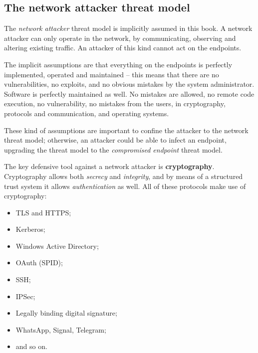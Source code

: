 \documentclass[10pt]{extbook}
\begin{document}
\subsection{The network attacker threat model}

The \emph{network attacker} threat model is implicitly assumed in this book. A
network attacker can only operate in the network, by communicating, observing
and altering existing traffic. An attacker of this kind cannot act on the
endpoints.

The implicit assumptions are that everything on the endpoints is perfectly
implemented, operated and maintained -- this means that there are no
vulnerabilities, no exploits, and no obvious mistakes by the system
administrator. Software is perfectly maintained as well. No mistakes are
allowed, no remote code execution, no vulnerability, no mistakes from the
users, in cryptography, protocols and communication, and operating systems.

These kind of assumptions are important to confine the attacker to the network
threat model; otherwise, an attacker could be able to infect an endpoint,
upgrading the threat model to the \emph{compromised endpoint} threat
model.

The key defensive tool against a network attacker is \textbf{cryptography}.
Cryptography allows both \emph{secrecy} and \emph{integrity}, and by means of a
structured trust system it allows \emph{authentication} as well. All of these
protocols make use of cryptography:
\begin{itemize}
    \item TLS and HTTPS;
    \item Kerberos;
    \item Windows Active Directory;
    \item OAuth (SPID);
    \item SSH;
    \item IPSec;
    \item Legally binding digital signature;
    \item WhatsApp, Signal, Telegram;
    \item and so on.
\end{itemize}
\end{document}
